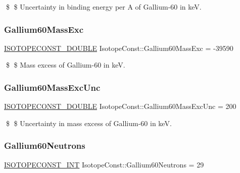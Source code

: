 \$ \$ Uncertainty in binding energy per A of Gallium-\/60 in keV. \mbox{\label{group___isotope_const-_gallium-_ga60_ga65397c230d168b7f569a55579b13918f}} 
\subsubsection{\texorpdfstring{Gallium60\+Mass\+Exc}{Gallium60MassExc}}
{\footnotesize\ttfamily \mbox{\hyperlink{group___isotope_const-_macros_ga8f45a7272ce02c0b4c65c44636ed719a}{I\+S\+O\+T\+O\+P\+E\+C\+O\+N\+S\+T\+\_\+\+D\+O\+U\+B\+LE}} Isotope\+Const\+::\+Gallium60\+Mass\+Exc = -\/39590}

\$ \$ Mass excess of Gallium-\/60 in keV. \mbox{\label{group___isotope_const-_gallium-_ga60_gac091d40a8a1d6e8052d14226fb903c2e}} 
\subsubsection{\texorpdfstring{Gallium60\+Mass\+Exc\+Unc}{Gallium60MassExcUnc}}
{\footnotesize\ttfamily \mbox{\hyperlink{group___isotope_const-_macros_ga8f45a7272ce02c0b4c65c44636ed719a}{I\+S\+O\+T\+O\+P\+E\+C\+O\+N\+S\+T\+\_\+\+D\+O\+U\+B\+LE}} Isotope\+Const\+::\+Gallium60\+Mass\+Exc\+Unc = 200}

\$ \$ Uncertainty in mass excess of Gallium-\/60 in keV. \mbox{\label{group___isotope_const-_gallium-_ga60_gab697fd12d36e5c2ad66c51135e3b0254}} 
\subsubsection{\texorpdfstring{Gallium60\+Neutrons}{Gallium60Neutrons}}
{\footnotesize\ttfamily \mbox{\hyperlink{group___isotope_const-_macros_ga5f18360b3e99483a35c32d789e62621c}{I\+S\+O\+T\+O\+P\+E\+C\+O\+N\+S\+T\+\_\+\+I\+NT}} Isotope\+Const\+::\+Gallium60\+Neutrons = 29}

